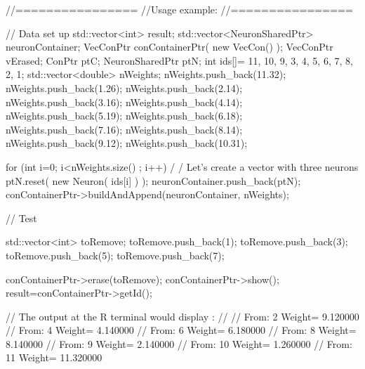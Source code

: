 \begin{DoxyCode}
        //================
        //Usage example:
        //================

        // Data set up
                        std::vector<int> result;
                        std::vector<NeuronSharedPtr> neuronContainer;
                        VecConPtr conContainerPtr( new VecCon() );
                        VecConPtr vErased;
                        ConPtr    ptC;
                        NeuronSharedPtr ptN;
                        int ids[]= {11, 10, 9, 3, 4, 5, 6, 7, 8, 2, 1};
                        std::vector<double> nWeights;
                        nWeights.push_back(11.32);
                        nWeights.push_back(1.26);
                        nWeights.push_back(2.14);
                        nWeights.push_back(3.16);
                        nWeights.push_back(4.14);
                        nWeights.push_back(5.19);
                        nWeights.push_back(6.18);
                        nWeights.push_back(7.16);
                        nWeights.push_back(8.14);
                        nWeights.push_back(9.12);
                        nWeights.push_back(10.31);

                        for (int i=0; i<nWeights.size() ; i++) {                         /
      / Let's create a vector with three neurons
                                ptN.reset( new Neuron( ids[i] ) );
                                neuronContainer.push_back(ptN);
                        }
                        conContainerPtr->buildAndAppend(neuronContainer, nWeights);

                        // Test

                        std::vector<int> toRemove;
                        toRemove.push_back(1);
                        toRemove.push_back(3);
                        toRemove.push_back(5);
                        toRemove.push_back(7);

                        conContainerPtr->erase(toRemove);
                        conContainerPtr->show();
                        result=conContainerPtr->getId();

                // The output at the R terminal would display :
                //
                // From:         2       Weight=         9.120000
                // From:         4       Weight=         4.140000
                // From:         6       Weight=         6.180000
                // From:         8       Weight=         8.140000
                // From:         9       Weight=         2.140000
                // From:         10  Weight=     1.260000
                // From:         11  Weight=     11.320000
\end{DoxyCode}


